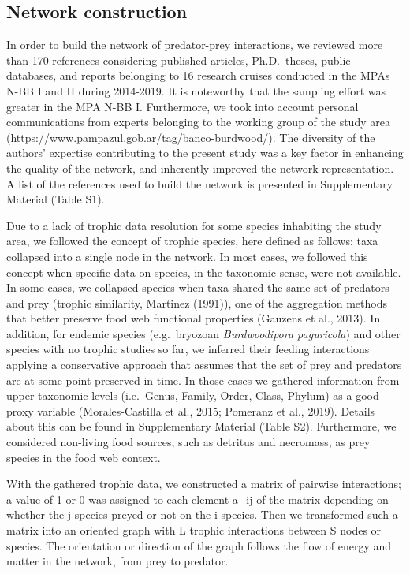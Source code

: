 \documentclass[preprint, 3p,
authoryear]{elsarticle} %
\begin{document}
\hypertarget{network-construction}{%
\subsection{Network construction}\label{network-construction}}

In order to build the network of predator-prey interactions, we reviewed
more than 170 references considering published articles, Ph.D.~theses,
public databases, and reports belonging to 16 research cruises conducted
in the MPAs N-BB I and II during 2014-2019. It is noteworthy that the
sampling effort was greater in the MPA N-BB I. Furthermore, we took into
account personal communications from experts belonging to the working
group of the study area
(https://www.pampazul.gob.ar/tag/banco-burdwood/). The diversity of the
authors' expertise contributing to the present study was a key factor in
enhancing the quality of the network, and inherently improved the
network representation. A list of the references used to build the
network is presented in Supplementary Material (Table S1).

Due to a lack of trophic data resolution for some species inhabiting the
study area, we followed the concept of trophic species, here defined as
follows: taxa collapsed into a single node in the network. In most
cases, we followed this concept when specific data on species, in the
taxonomic sense, were not available. In some cases, we collapsed species
when taxa shared the same set of predators and prey (trophic similarity,
Martinez (1991)), one of the aggregation methods that better preserve
food web functional properties (Gauzens et al., 2013). In addition, for
endemic species (e.g.~bryozoan \emph{Burdwoodipora paguricola}) and
other species with no trophic studies so far, we inferred their feeding
interactions applying a conservative approach that assumes that the set
of prey and predators are at some point preserved in time. In those
cases we gathered information from upper taxonomic levels (i.e.~Genus,
Family, Order, Class, Phylum) as a good proxy variable (Morales-Castilla
et al., 2015; Pomeranz et al., 2019). Details about this can be found in
Supplementary Material (Table S2). Furthermore, we considered non-living
food sources, such as detritus and necromass, as prey species in the
food web context.

With the gathered trophic data, we constructed a matrix of pairwise
interactions; a value of 1 or 0 was assigned to each element a\_ij of
the matrix depending on whether the j-species preyed or not on the
i-species. Then we transformed such a matrix into an oriented graph with
L trophic interactions between S nodes or species. The orientation or
direction of the graph follows the flow of energy and matter in the
network, from prey to predator.
\end{document}
